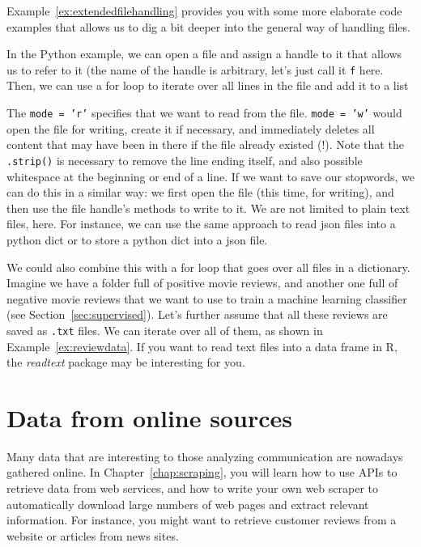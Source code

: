 Example~\ref{ex:extendedfilehandling} provides you with some more elaborate code examples that allows us to dig a bit deeper into the general way of handling files.

In the Python example,  we can open a file and assign a handle to it that allows us to refer to it (the name of the handle is arbitrary, let's just call it \texttt{f} here.
Then, we can use a for loop to iterate over all lines in the file and add it to a list

The \texttt{mode = 'r'} specifies that we want to read from the file. \texttt{mode = 'w'} would open the file for writing, create it if necessary, and immediately deletes all content that may have been in there if the file already existed (!).
Note that the \texttt{.strip()} is necessary to remove the line ending itself, and also possible whitespace at the beginning or end of a line.
If we want to save our stopwords, we can do this in a similar way: we first open the file (this time, for writing), and then use the file handle's methods to write to it.
We are not limited to plain text files, here. For instance, we can use the same approach to read json files into a python dict or to store a python dict into a json file.

We could also combine this with a for loop that goes over all files in a dictionary.
Imagine we have a folder full of positive movie reviews, and another one full of negative movie reviews that we want to use to train a machine learning classifier (see Section~\ref{sec:supervised}).
Let's further assume that all these reviews are saved as \texttt{.txt} files.
We can iterate over all of them, as shown in Example~\ref{ex:reviewdata}. If you want to read text files into a data frame in R, the \emph{readtext} package may be interesting for you.


\section{Data from online sources}
\label{sec:gathering}

Many data that are interesting to those analyzing communication are
nowadays gathered online. In Chapter~\ref{chap:scraping}, you will
learn how to use APIs to retrieve data from web services, and how to
write your own web scraper to automatically download large numbers of
web pages and extract relevant information. For instance, you might
want to retrieve customer reviews from a website or articles from news
sites.

